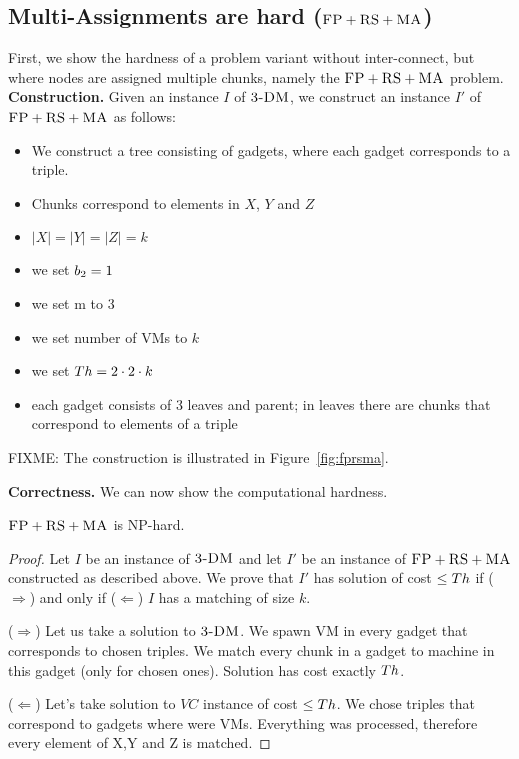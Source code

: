\subsection{Multi-Assignments are hard ($\textsc{FP}+\textsc{RS}+\textsc{MA}$)}\label{ssec:fprsma}

First, we show the hardness of a problem variant without inter-connect,
but where nodes are assigned multiple chunks, namely the $\textsc{FP}+\textsc{RS}+\textsc{MA}$
problem.
\textbf{Construction.}
Given an instance $I$ of $\textsc{3-DM}$, we construct an instance $I'$ of
$\textsc{FP}+\textsc{RS}+\textsc{MA}$ as follows:
\begin{itemize}
\item We construct a tree consisting of gadgets, where each gadget corresponds to a triple.
\item Chunks correspond to elements in $X$, $Y$ and $Z$
\item $|X| = |Y| = |Z| = k$
\item we set $b_2=1$
\item we set m to 3
\item we set number of VMs to $k$
\item we set $Th=2 \cdot 2 \cdot k$
\item each gadget consists of 3 leaves and parent; in leaves there are
  chunks that correspond to elements of a triple
\end{itemize}

FIXME: The construction is illustrated in Figure~\ref{fig:fprsma}.

\textbf{Correctness.}
We can now show the computational hardness.
\begin{theorem}
$\textsc{FP}+\textsc{RS}+\textsc{MA}$ is NP-hard.
\end{theorem}
\begin{proof}
Let $I$ be an instance of $\textsc{3-DM}$ and let $I'$ be an instance of
$\textsc{FP}+\textsc{RS}+\textsc{MA}$ constructed as described above.
We prove that $I'$ has solution of cost $\leq Th$ if ($\Rightarrow$) and only if
($\Leftarrow$)
$I$ has a matching of size $k$.

($\Rightarrow$) Let us take a solution to $\textsc{3-DM}$. We spawn VM in every
gadget that corresponds to chosen triples. We match every chunk in a
gadget to machine in this gadget (only for chosen ones). Solution has
cost exactly $Th$.

($\Leftarrow$) Let's take solution to $VC$ instance of cost $\leq Th$. We
chose triples that correspond to gadgets where were VMs. Everything
was processed, therefore every element of X,Y and Z is matched.
\end{proof}


